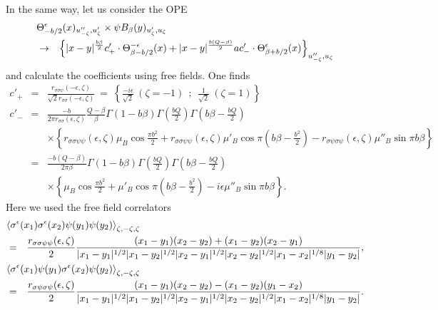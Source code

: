 \documentclass[a4paper,12pt]{article}
\newcommand{\vev}[1]{\left<{#1}\right>}
\newcommand{\tfrac}[2]{{\textstyle\frac{#1}{#2}}}
\newcommand{\ep}{{\epsilon}}
\begin{document}
   In the same way, let us consider the OPE
\begin{eqnarray}
\lefteqn{
  \Theta_{-b/2}^\ep(x)_{u''_{-\zeta},u'_\zeta} \times
  \psi B_\beta(y)_{u'_\zeta,u_\zeta}
} \nonumber \\
 &\rightarrow&
  \left\{
  |x-y|^{\frac{b\beta}{2}}
  c'_+\cdot\Theta_{\beta-b/2}^{-\ep}(x)
 +|x-y|^{\frac{b(Q-\beta)}{2}}
  a c'_-\cdot\Theta_{\beta+b/2}^\ep(x)
  \right\}_{u''_{-\zeta},u_\zeta}
\end{eqnarray}
 and calculate the coefficients using free fields.
 One finds
\begin{eqnarray}
  c'_+ &=& \frac{r_{\sigma\sigma\psi}(-\ep,\zeta)}
                {\sqrt{2}r_{\sigma\sigma}(-\ep,\zeta)}
 ~=~ \left\{\frac{-i\ep}{\sqrt{2}}~(\zeta=-1) ~~ ;  ~~
            \frac{1}{\sqrt{2}}~(\zeta=1) \right\}
 \nonumber \\
  c'_- &=&
  \frac{-b}{2\pi r_{\sigma\sigma}(\ep,\zeta)}
  \frac{Q-\beta}{\beta}
  \Gamma(1-b\beta)\Gamma(\tfrac{bQ}{2})\Gamma(b\beta-\tfrac{bQ}{2})
 \nonumber \\ && \times
 \left\{
   r_{\sigma\sigma\psi\psi}(\ep,\zeta)\mu_B
   \cos\tfrac{\pi b^2}{2}
  +r_{\sigma\sigma\psi\psi}(\ep,\zeta)\mu'_B
   \cos\pi(b\beta-\tfrac{b^2}{2})
  -r_{\sigma\psi\sigma\psi}(\ep,\zeta)\mu''_B
   \sin\pi b\beta
 \right\}
 \nonumber \\
 &=&
  \frac{-b(Q-\beta)}{2\pi\beta}
  \Gamma(1-b\beta)\Gamma(\tfrac{bQ}{2})\Gamma(b\beta-\tfrac{bQ}{2})
 \nonumber \\ && \times
 \left\{
   \mu_B \cos\tfrac{\pi b^2}{2}
  +\mu'_B\cos\pi(b\beta-\tfrac{b^2}{2})
  -i\ep \mu''_B\sin\pi b\beta
 \right\}.
\end{eqnarray}
 Here we used the free field correlators
\begin{eqnarray}
\lefteqn{
  \vev{\sigma^\ep(x_1)\sigma^\ep(x_2)\psi(y_1)\psi(y_2)}_{\zeta,-\zeta,\zeta}
}\nonumber \\
 &=& \frac{r_{\sigma\sigma\psi\psi}(\ep,\zeta)}{2}
     \frac{(x_1-y_1)(x_2-y_2)+(x_1-y_2)(x_2-y_1)}
          {|x_1-y_1|^{1/2}|x_1-y_2|^{1/2}|x_2-y_1|^{1/2}|x_2-y_2|^{1/2}
           |x_1-x_2|^{1/8}|y_1-y_2|},
\nonumber \\
\lefteqn{
  \vev{\sigma^\ep(x_1)\psi(y_1)\sigma^\ep(x_2)\psi(y_2)}_{\zeta,-\zeta,\zeta}
}\nonumber \\
 &=& \frac{r_{\sigma\psi\sigma\psi}(\ep,\zeta)}{2}
     \frac{(x_1-y_1)(x_2-y_2)-(x_1-y_2)(y_1-x_2)}
          {|x_1-y_1|^{1/2}|x_1-y_2|^{1/2}|x_2-y_1|^{1/2}|x_2-y_2|^{1/2}
           |x_1-x_2|^{1/8}|y_1-y_2|}.
\end{eqnarray}
\end{document}
